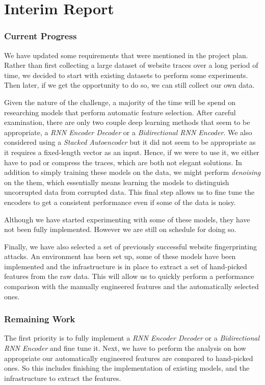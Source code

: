 \chapter{Interim Report}

\begingroup

\renewcommand{\thesubsection}{\arabic{subsection}}

\renewcommand{\addcontentsline}[3]{}%

\subsection{Current Progress}
We have updated some requirements that were mentioned in the project plan.
Rather than first collecting a large dataset of website traces over a long period of time,
we decided to start with existing datasets to perform some experiments. Then later, if we get the opportunity to do so, we can still collect our own data.

Given the nature of the challenge, a majority of the time will be spend on researching models that perform automatic feature selection.
After careful examination, there are only two couple deep learning methods that seem to be appropriate, a \textit{RNN Encoder Decoder} or a \textit{Bidirectional RNN Encoder}.
We also considered using a \textit{Stacked Autoencoder}  but it did not seem to be appropriate as it requires a fixed-length vector as an input.
Hence, if we were to use it, we either have to pad or compress the traces, which are both not elegant solutions.
In addition to simply training these models on the data, we might perform \textit{denoising} on the them, which essentially means learning the models to distinguish uncorrupted data from corrupted data.
This final step allows us to fine tune the encoders to get a consistent performance even if some of the data is noisy.

Although we have started experimenting with some of these models, they have not been fully implemented.
However we are still on schedule for doing so.

Finally, we have also selected a set of previously successful website fingerprinting attacks.
An environment has been set up, some of these models have been implemented and the infrastructure is in place to extract a set of hand-picked features from the raw data.
This will allow us to quickly perform a performance comparison with the manually engineered features and the automatically selected ones.

\subsection{Remaining Work}
The first priority is to fully implement a \textit{RNN Encoder Decoder} or a \textit{Bidirectional RNN Encoder} and fine tune it.
Next, we have to perform the analysis on how appropriate our automatically engineered features are compared to hand-picked ones.
So this includes finishing the implementation of existing models, and the infrastructure to extract the features.

